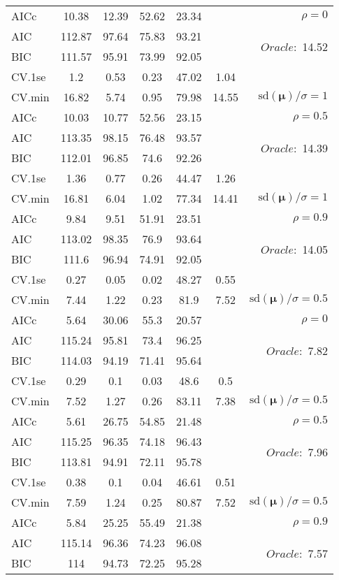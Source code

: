 \begin{table}
\begin{center}
\begin{tabular}{l*{5}{c}|r}
AICc & 10.38 & 12.39 & 52.62 & 23.34 & & $\rho=0$ \\
AIC & 112.87 & 97.64 & 75.83 & 93.21 & &  \multirow{2}{*}{$Oracle: $ 14.52} \\
BIC & 111.57 & 95.91 & 73.99 & 92.05 & &  \\
 \hline 
CV.1se & 1.2 & 0.53 & 0.23 & 47.02 & 1.04 & \\
CV.min & 16.82 & 5.74 & 0.95 & 79.98 & 14.55 &  $\mathrm{sd}(\mathbf{\mu})/\sigma=1$ \\
AICc & 10.03 & 10.77 & 52.56 & 23.15 & & $\rho=0.5$ \\
AIC & 113.35 & 98.15 & 76.48 & 93.57 & &  \multirow{2}{*}{$Oracle: $ 14.39} \\
BIC & 112.01 & 96.85 & 74.6 & 92.26 & &  \\
 \hline 
CV.1se & 1.36 & 0.77 & 0.26 & 44.47 & 1.26 & \\
CV.min & 16.81 & 6.04 & 1.02 & 77.34 & 14.41 &  $\mathrm{sd}(\mathbf{\mu})/\sigma=1$ \\
AICc & 9.84 & 9.51 & 51.91 & 23.51 & & $\rho=0.9$ \\
AIC & 113.02 & 98.35 & 76.9 & 93.64 & &  \multirow{2}{*}{$Oracle: $ 14.05} \\
BIC & 111.6 & 96.94 & 74.91 & 92.05 & &  \\
 \hline 
CV.1se & 0.27 & 0.05 & 0.02 & 48.27 & 0.55 & \\
CV.min & 7.44 & 1.22 & 0.23 & 81.9 & 7.52 &  $\mathrm{sd}(\mathbf{\mu})/\sigma=0.5$ \\
AICc & 5.64 & 30.06 & 55.3 & 20.57 & & $\rho=0$ \\
AIC & 115.24 & 95.81 & 73.4 & 96.25 & &  \multirow{2}{*}{$Oracle: $ 7.82} \\
BIC & 114.03 & 94.19 & 71.41 & 95.64 & &  \\
 \hline 
CV.1se & 0.29 & 0.1 & 0.03 & 48.6 & 0.5 & \\
CV.min & 7.52 & 1.27 & 0.26 & 83.11 & 7.38 &  $\mathrm{sd}(\mathbf{\mu})/\sigma=0.5$ \\
AICc & 5.61 & 26.75 & 54.85 & 21.48 & & $\rho=0.5$ \\
AIC & 115.25 & 96.35 & 74.18 & 96.43 & &  \multirow{2}{*}{$Oracle: $ 7.96} \\
BIC & 113.81 & 94.91 & 72.11 & 95.78 & &  \\
 \hline 
CV.1se & 0.38 & 0.1 & 0.04 & 46.61 & 0.51 & \\
CV.min & 7.59 & 1.24 & 0.25 & 80.87 & 7.52 &  $\mathrm{sd}(\mathbf{\mu})/\sigma=0.5$ \\
AICc & 5.84 & 25.25 & 55.49 & 21.38 & & $\rho=0.9$ \\
AIC & 115.14 & 96.36 & 74.23 & 96.08 & &  \multirow{2}{*}{$Oracle: $ 7.57} \\
BIC & 114 & 94.73 & 72.25 & 95.28 & &  \\
 \hline 
\end{tabular}
\end{center}
\vspace{-1cm}
\end{table}





